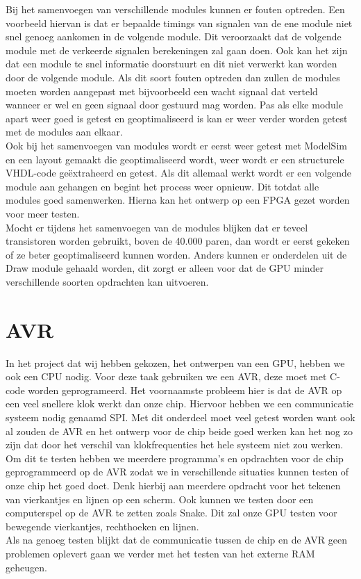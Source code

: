 \documentclass{scrartcl} %
\begin{document}
Bij het samenvoegen van verschillende modules kunnen er fouten optreden. Een voorbeeld hiervan is dat er bepaalde timings van signalen van de ene module niet snel genoeg aankomen in de volgende module.
Dit veroorzaakt dat de volgende module met de verkeerde signalen berekeningen zal gaan doen. Ook kan het zijn dat een module te snel informatie doorstuurt en dit niet verwerkt kan worden door de volgende module.
Als dit soort fouten optreden dan zullen de modules moeten worden aangepast met bijvoorbeeld een wacht signaal dat verteld wanneer er wel en geen signaal door gestuurd mag worden. Pas als elke module apart weer goed is getest 
en geoptimaliseerd is kan er weer verder worden getest met de modules aan elkaar.\\
Ook bij het samenvoegen van modules wordt er eerst weer getest met ModelSim en een layout gemaakt die geoptimaliseerd wordt, weer wordt er een structurele VHDL-code geëxtraheerd en getest. Als dit allemaal werkt wordt er een volgende 
module aan gehangen en begint het process weer opnieuw. Dit totdat alle modules goed samenwerken. Hierna kan het ontwerp op een FPGA gezet worden voor meer testen.\\
Mocht er tijdens het samenvoegen van de modules blijken dat er teveel transistoren worden gebruikt, boven de 40.000 paren, dan wordt er eerst gekeken of ze beter geoptimaliseerd kunnen worden. Anders kunnen er onderdelen uit de Draw module gehaald worden,
 dit zorgt er alleen voor dat de GPU minder verschillende soorten opdrachten kan uitvoeren.


\section{AVR}

In het project dat wij hebben gekozen, het ontwerpen van een GPU, hebben we ook een CPU nodig. Voor deze taak gebruiken we een AVR, deze moet met C-code worden geprogrameerd. Het voornaamste probleem hier is dat 
de AVR op een veel snellere klok werkt dan onze chip. Hiervoor hebben we een communicatie systeem nodig genaamd SPI. Met dit onderdeel moet veel getest worden want ook al zouden de AVR en het ontwerp voor de chip beide goed werken 
kan het nog zo zijn dat door het verschil van klokfrequenties het hele systeem niet zou werken.\\
Om dit te testen hebben we meerdere programma's en opdrachten voor de chip geprogrammeerd op de AVR zodat we in verschillende situaties kunnen testen of onze chip het goed doet. Denk hierbij aan meerdere opdracht voor het tekenen van vierkantjes
en lijnen op een scherm. Ook kunnen we testen door een computerspel op de AVR te zetten zoals Snake. Dit zal onze GPU testen voor bewegende vierkantjes, rechthoeken en lijnen.\\
Als na genoeg testen blijkt dat de communicatie tussen de chip en de AVR geen problemen oplevert gaan we verder met het testen van het externe RAM geheugen.
\end{document}

